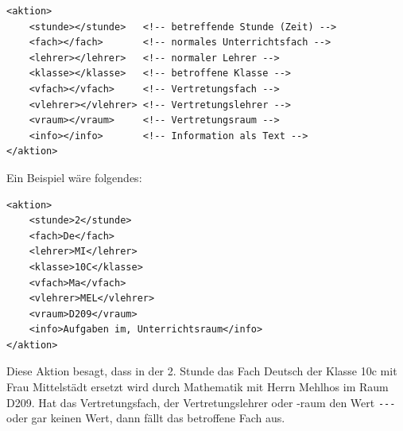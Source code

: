 
\begin{lstlisting}
<aktion>
	<stunde></stunde>   <!-- betreffende Stunde (Zeit) -->
	<fach></fach>       <!-- normales Unterrichtsfach -->
	<lehrer></lehrer>   <!-- normaler Lehrer -->
	<klasse></klasse>   <!-- betroffene Klasse -->
	<vfach></vfach>     <!-- Vertretungsfach -->
	<vlehrer></vlehrer>	<!-- Vertretungslehrer -->
	<vraum></vraum>     <!-- Vertretungsraum -->
	<info></info>       <!-- Information als Text -->
</aktion>
\end{lstlisting}
Ein Beispiel wäre folgendes:

\begin{lstlisting}
<aktion>
	<stunde>2</stunde>
	<fach>De</fach>
	<lehrer>MI</lehrer>
	<klasse>10C</klasse>
	<vfach>Ma</vfach>
	<vlehrer>MEL</vlehrer>
	<vraum>D209</vraum>
	<info>Aufgaben im, Unterrichtsraum</info>
</aktion>
\end{lstlisting}
Diese Aktion besagt, dass in der 2. Stunde das Fach Deutsch der Klasse 10c mit Frau Mittelstädt ersetzt 
wird durch Mathematik mit Herrn Mehlhos im Raum D209. Hat das Vertretungsfach, der Vertretungslehrer oder
-raum den Wert \glqq\texttt{-{}-{}-}\grqq{} oder gar keinen Wert, dann fällt das betroffene Fach aus.

